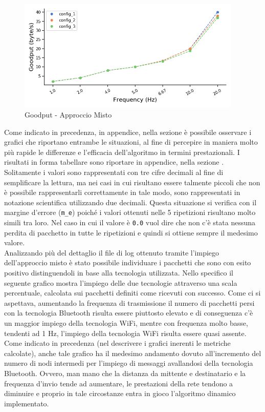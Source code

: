 \begin{figure}[hbt!]
    \centering
    \includegraphics[width = 0.95\textwidth]{images/graphs/ble_wifi_goodput.png}
    \caption{Goodput - Approccio Misto}
    \label{graph:ble_wifi_goodput}
\end{figure}

\noindent Come indicato in precedenza, in appendice, nella sezione \textit{} è possibile osservare i grafici che riportano entrambe le situazioni, al fine di percepire in maniera molto più rapide le differenze e l'efficacia dell'algoritmo in termini prestazionali. I risultati in forma tabellare sono riportare in appendice, nella sezione . 
Solitamente i valori sono rappresentati con tre cifre decimali al fine di semplificare la lettura, ma nei casi in cui risultano essere talmente piccoli che non è possibile rappresentarli correttamente in tale modo, sono rappresentati in notazione scientifica utilizzando due decimali. Questa situazione si verifica con il margine d'errore (\texttt{m\_e}) poiché i valori ottenuti nelle 5 ripetizioni risultano molto simili tra loro. Nel caso in cui il valore è \texttt{0.0} vuol dire che non c'è stata nessuna perdita di pacchetto in tutte le ripetizioni e quindi si ottiene sempre il medesimo valore.\\

\noindent Analizzando più del dettaglio il file di log ottenuto tramite l'impiego dell'approccio misto è stato possibile individuare i pacchetti che sono con esito positivo distinguendoli in base alla tecnologia utilizzata. Nello specifico il seguente grafico mostra l'impiego delle due tecnologie attraverso una scala percentuale, calcolata sui pacchetti definiti come ricevuti con successo. Come ci si aspettava, aumentando la
frequenza di trasmissione il numero di pacchetti persi con la tecnologia Bluetooth risulta essere piuttosto elevato e di conseguenza c'è un maggior impiego della tecnologia WiFi, mentre con frequenza molto basse, tendenti ad 1 Hz, l'impiego della tecnologia WiFi risulta essere quasi assente. Come indicato in precedenza (nel descrivere i grafici inerenti le metriche calcolate), anche tale grafico ha il medesimo andamento dovuto all'incremento del numero di nodi intermedi per l'impiego di messaggi avallandosi della tecnologia Bluetooth. Ovvero, man mano che la distanza da mittente e destinatario e la frequenza d'invio tende ad aumentare, le prestazioni della rete tendono a diminuire e proprio in tale circostanze entra in gioco l'algoritmo dinamico implementato.

